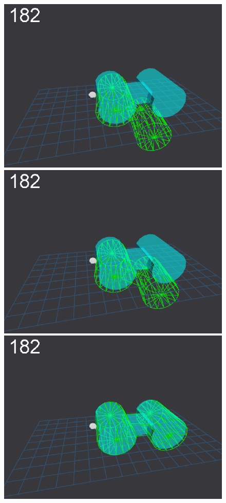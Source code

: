 \begin{figure}[tbp]
{\includegraphics[width=\imgCXwid]{images/C5_1exp_6_3}
\includegraphics[width=\imgCXwid]{images/C5_2exp_6_3}
\includegraphics[width=\imgCXwid]{images/C5_3exp_6_3}
}
\end{figure}
